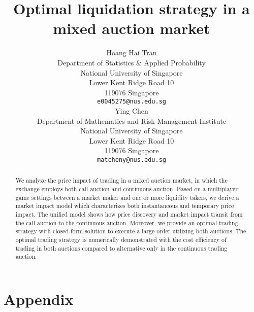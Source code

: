 \documentclass{article}
\title{Optimal liquidation strategy in a mixed auction market}
\author{
 Hoang Hai Tran\\
 Department of Statistics \& Applied Probability\\
 National University of Singapore \\
 Lower Kent Ridge Road 10 \\
 119076 Singapore \\
 \texttt{e0045275@nus.edu.sg} \\
   \And
 Ying Chen\\
 Department of Mathematics and Risk Management Institute \\
 National University of Singapore \\
 Lower Kent Ridge Road 10 \\
 119076 Singapore \\
 \texttt{matcheny@nus.edu.sg} \\
}
\begin{document}
\maketitle

\begin{abstract}
  We analyze the price impact of trading in a mixed auction market, in which the exchange employs both call auction and continuous auction. Based on a multiplayer game settings between a market maker and one or more liquidity takers, we derive a market impact model which characterizes both instantaneous and temporary price impact. The unified model shows how price discovery and market impact transit from the call auction to the continuous auction. Moreover, we provide an optimal trading strategy with closed-form solution to execute a large order utilizing both auctions. The optimal trading strategy is numerically demonstrated with the cost efficiency of trading in both auctions compared to alternative only in the continuous trading auction.
\end{abstract}


\section{Appendix}




\end{document}
